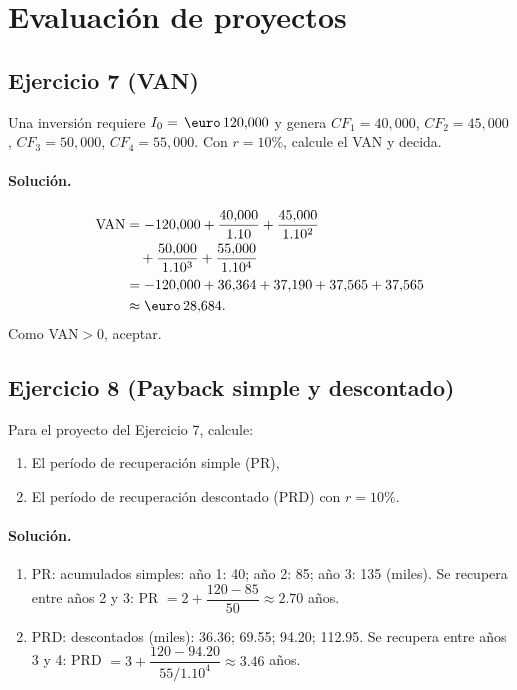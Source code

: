 \documentclass[12pt,a4paper]{article}
\newenvironment{ejercicio}[1]{\subsection*{Ejercicio #1}}{}
\newenvironment{solucion}{\paragraph{Solución.}}{}
\begin{document}
\section{Evaluación de proyectos}

\begin{ejercicio}{7 (VAN)}
Una inversión requiere $I_0=\,\text{\euro}\,120{,}000$ y genera $CF_1=40{,}000$, $CF_2=45{,}000$, $CF_3=50{,}000$, $CF_4=55{,}000$. Con $r=10\%$, calcule el VAN y decida.
\end{ejercicio}
\begin{solucion}
\begin{align*}
\text{VAN}&=-120{,}000+\frac{40{,}000}{1.10}+\frac{45{,}000}{1.10^2}\\
&\quad+\frac{50{,}000}{1.10^3}+\frac{55{,}000}{1.10^4}\\
&=-120{,}000+36{,}364+37{,}190+37{,}565+37{,}565\\
&\approx\text{\euro}\,28{,}684.
\end{align*}
Como VAN$>0$, aceptar.
\end{solucion}

\begin{ejercicio}{8 (Payback simple y descontado)}
Para el proyecto del Ejercicio 7, calcule:
\begin{enumerate}[label=\alph*)]
  \item El período de recuperación simple (PR),
  \item El período de recuperación descontado (PRD) con $r=10\%$.
\end{enumerate}
\end{ejercicio}
\begin{solucion}
\begin{enumerate}[label=\alph*)]
  \item PR: acumulados simples: año 1: 40; año 2: 85; año 3: 135 (miles). Se recupera entre años 2 y 3: PR $=2+\dfrac{120-85}{50}\approx2.70$ años.
  \item PRD: descontados (miles): 36.36; 69.55; 94.20; 112.95. Se recupera entre años 3 y 4: PRD $=3+\dfrac{120-94.20}{55/1.10^4}\approx3.46$ años.
\end{enumerate}
\end{solucion}
\end{document}
